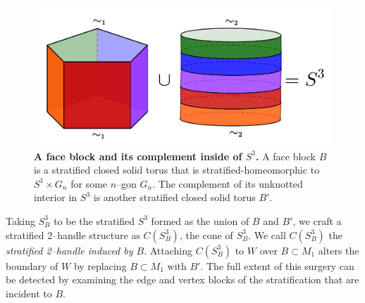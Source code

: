 \begin{figure}[h!]
	\centering
	\includegraphics[width=\textwidth]{figures/face-block-complement.png}
	\caption{
		\textbf{A face block and its complement inside of $S^3$.}
		A face block $B$ is a stratified closed solid torus that is stratified-homeomorphic to $S^1\times G_n$ for some $n$--gon $G_n$.
		The complement of its unknotted interior in $S^3$ is another stratified closed solid torus $B'$.
	}
	\label{fig:face-block-complement}
\end{figure}

Taking $S_B^3$ to be the stratified $S^3$ formed as the union of $B$ and $B'$, we craft a stratified 2--handle structure as $C(S_B^3)$, the cone of $S_B^3$.
We call $C(S_B^3)$ the \emph{stratified 2--handle induced by $B$}.
Attaching $C(S_B^3)$ to $W$ over $B\subset M_1$ alters the boundary of $W$ by replacing $B\subset M_1$ with $B'$.
The full extent of this surgery can be detected by examining the edge and vertex blocks of the stratification that are incident to $B$.

